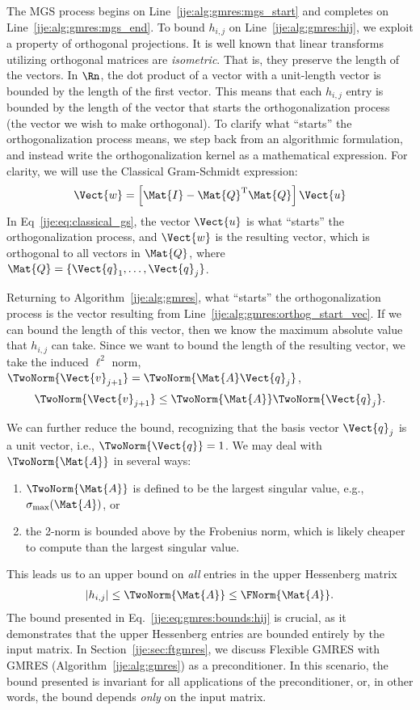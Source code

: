 The MGS process begins on Line~\ref{jje:alg:gmres:mgs_start} and completes on Line~\ref{jje:alg:gmres:mgs_end}.
To bound $h_{i,j}$ on Line~\ref{jje:alg:gmres:hij}, we exploit a property of
orthogonal projections. It is well known that linear transforms
utilizing orthogonal matrices are \emph{isometric}.  That is, they preserve the
length of the vectors. In $\Rn$, the dot product of a vector with a
unit-length vector is bounded by the length of the first vector.
This means that each $h_{i,j}$ entry is bounded by the length of
the vector that starts the orthogonalization process (the vector we wish to
make orthogonal).
To clarify what ``starts'' the orthogonalization process means, we step back from an algorithmic
formulation, and instead write the orthogonalization kernel as a mathematical
expression.  For clarity, we will use the Classical Gram-Schmidt expression:
\begin{equation}
\Vect{w} = \left[ \Mat{I} - \Mat{Q}^{\text{T}}\Mat{Q} \right]\Vect{u}
\label{jje:eq:classical_gs}
\end{equation}
In Eq~\eqref{jje:eq:classical_gs}, the vector $\Vect{u}$ is what ``starts''
the orthogonalization process, and $\Vect{w}$ is the resulting vector, which is
orthogonal to all vectors in $\Mat{Q}$, where $\Mat{Q} = \{\Vect{q}_1, \dotsc,
\Vect{q}_j\}$.

Returning to Algorithm~\ref{jje:alg:gmres}, what ``starts'' the
orthogonalization process is the vector resulting from
Line~\ref{jje:alg:gmres:orthog_start_vec}. If we can bound the length of this
vector, then we know the maximum absolute value that $h_{i,j}$ can take.
Since we want to bound the length of the resulting vector, we take the
induced $\ell^2$ norm, $\TwoNorm{\Vect{v}_{j+1}} =
\TwoNorm{\Mat{A}\Vect{q}_j}$,
\begin{equation}
\TwoNorm{\Vect{v}_{j+1}} \leq \TwoNorm{\Mat{A}}\TwoNorm{\Vect{q}_j}.
\label{jje:eq:H_bound}
\end{equation}

We can further reduce the bound, recognizing that the basis vector $\Vect{q}_j$
is a unit vector, i.e., $\TwoNorm{\Vect{q}} = 1$. We may deal with
$\TwoNorm{\Mat{A}}$ in several ways: 
\begin{enumerate}
  \item 
$\TwoNorm{\Mat{A}}$ is defined to be
the largest singular value, e.g., $\sigma_\mathrm{max} (\Mat{A})$, or
\item
the 2-norm
is bounded above by the Frobenius norm, which is likely cheaper to compute than
the largest singular value.
\end{enumerate}
 This leads us to an upper bound on \emph{all}
entries in the upper Hessenberg matrix
\begin{align}
|h_{i,j}| \leq \TwoNorm{\Mat{A}} \leq \FNorm{\Mat{A}}.
\label{jje:eq:gmres:bounds:hij}
\end{align}
The bound presented in Eq.~\eqref{jje:eq:gmres:bounds:hij} is crucial, as it
demonstrates that the upper Hessenberg entries are bounded entirely by the input
matrix. In Section~\ref{jje:sec:ftgmres}, we discuss Flexible GMRES
with GMRES (Algorithm~\ref{jje:alg:gmres}) as a preconditioner. In this
scenario, the bound presented is invariant for all applications of the
preconditioner, or, in other words, the bound depends \emph{only} on the input
matrix.
